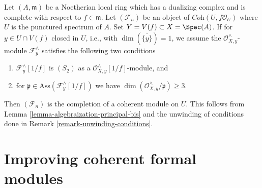 \begin{remark}
\label{remark-interesting-case-bis}
Let $(A, \mathfrak m)$ be a Noetherian local ring which has a
dualizing complex and is complete with respect to $f \in \mathfrak m$.
Let $(\mathcal{F}_n)$ be an object of $\textit{Coh}(U, f\mathcal{O}_U)$
where $U$ is the punctured spectrum of $A$.
Set $Y = V(f) \subset X = \Spec(A)$.
If for $y \in U \cap V(f)$ closed in $U$, i.e., with
$\dim(\overline{\{y\}}) = 1$, we assume the
$\mathcal{O}_{X, y}^\wedge$-module $\mathcal{F}_y^\wedge$
satisfies the following two conditions
\begin{enumerate}
\item $\mathcal{F}_y^\wedge[1/f]$ is $(S_2)$ as a
$\mathcal{O}_{X, y}^\wedge[1/f]$-module, and
\item for $\mathfrak p \in \text{Ass}(\mathcal{F}_y^\wedge[1/f])$
we have $\dim(\mathcal{O}_{X, y}^\wedge/\mathfrak p) \geq 3$.
\end{enumerate}
Then $(\mathcal{F}_n)$ is the completion of a coherent module on $U$.
This follows from Lemma \ref{lemma-algebraization-principal-bis}
and the unwinding of conditions
done in Remark \ref{remark-unwinding-conditions}.
\end{remark}
































\section{Improving coherent formal modules}
\label{section-improving-formal-modules}

